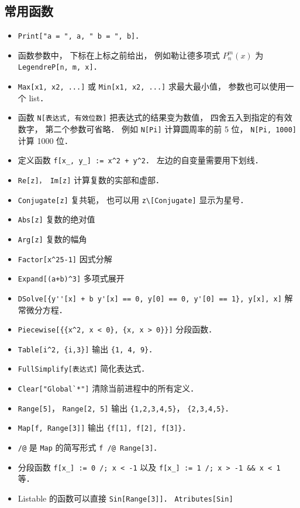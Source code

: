 \subsection{常用函数}
\begin{itemize}
\item \verb|Print["a = ", a, " b = ", b]|．
\item 函数参数中， 下标在上标之前给出， 例如勒让德多项式 $P_n^m(x)$ 为 \verb|LegendreP[n, m, x]|．
\item \verb|Max[x1, x2, ...]| 或 \verb|Min[x1, x2, ...]| 求最大最小值， 参数也可以使用一个 list．
\item 函数 \verb|N[表达式, 有效位数]| 把表达式的结果变为数值， 四舍五入到指定的有效数字， 第二个参数可省略． 例如 \verb|N[Pi]| 计算圆周率的前 5 位， \verb|N[Pi, 1000]| 计算 1000 位．
\item 定义函数 \verb|f[x_, y_] := x^2 + y^2|． 左边的自变量需要用下划线．
\item \verb|Re[z]， Im[z]| 计算复数的实部和虚部．
\item \verb|Conjugate[z]| 复共轭， 也可以用 \verb|z\[Conjugate]| 显示为星号．
\item \verb|Abs[z]| 复数的绝对值
\item \verb|Arg[z]| 复数的幅角
\item \verb|Factor[x^25-1]| 因式分解
\item \verb|Expand[(a+b)^3]| 多项式展开
\item \verb|DSolve[{y''[x] + b y'[x] == 0, y[0] == 0, y'[0] == 1}, y[x], x]| 解常微分方程．
\item \verb|Piecewise[{{x^2, x < 0}, {x, x > 0}}]| 分段函数．
\item \verb|Table[i^2, {i,3}]| 输出 \verb|{1, 4, 9}|．
\item \verb|FullSimplify[表达式]| 简化表达式．
\item \verb|Clear["Global`*"]| 清除当前进程中的所有定义．
\item \verb|Range[5]|， \verb|Range[2, 5]| 输出 \verb|{1,2,3,4,5}|， \verb|{2,3,4,5}|．
\item \verb|Map[f, Range[3]]| 输出 \verb|{f[1], f[2], f[3]}|．
\item \verb|/@| 是 \verb|Map| 的简写形式 \verb|f /@ Range[3]|．
\item 分段函数 \verb|f[x_] := 0 /; x < -1| 以及 \verb|f[x_] := 1 /; x > -1 && x < 1| 等．
\item Listable 的函数可以直接 \verb|Sin[Range[3]]|． \verb|Atributes[Sin]|
\end{itemize}

